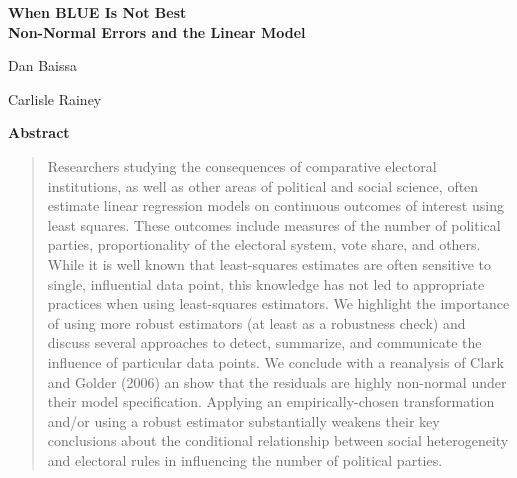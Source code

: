 \documentclass[12pt]{article}
\begin{document}
\begin{center}
{\LARGE \textbf{When BLUE Is Not Best}}\\\vspace{2mm}
{ \textbf{Non-Normal Errors and the Linear Model}}\\\vspace{2mm}


\vspace{10mm}

Dan Baissa

\vspace{3mm}

Carlisle Rainey
\end{center}

\vspace{10mm}

{\centerline{\textbf{Abstract}}}
\begin{quote}\noindent
Researchers studying the consequences of comparative electoral institutions, as well as other areas of political and social science, often estimate linear regression models on continuous outcomes of interest using least squares. These outcomes include measures of the number of political parties, proportionality of the electoral system, vote share, and others. While it is well known that least-squares estimates are often sensitive to single, influential data point, this knowledge has not led to appropriate practices when using least-squares estimators. We highlight the importance of using more robust estimators (at least as a robustness check) and discuss several approaches to detect, summarize, and communicate the influence of particular data points. We conclude with a reanalysis of Clark and Golder (2006) an show that the residuals are highly non-normal under their model specification. Applying an empirically-chosen transformation and/or using a robust estimator substantially weakens their key conclusions about the conditional relationship between social heterogeneity and electoral rules in influencing the number of political parties.
 \end{quote}
\end{document}
